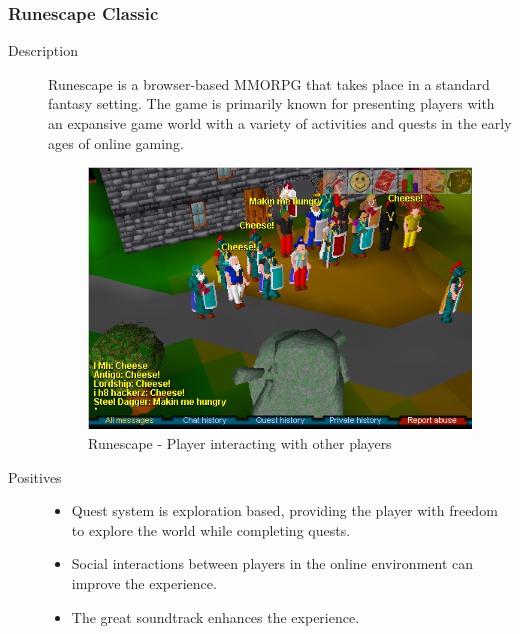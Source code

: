 \clearpage
\subsubsection{Runescape Classic}
\begin{description}
\item[Description]{Runescape is a browser-based MMORPG that takes place in a standard fantasy setting. The game is primarily known for presenting players with an expansive game world with a variety of activities and quests in the early ages of online gaming.

\begin{figure}[H]
	\centering\includegraphics[width=.25\linewidth]{images/game_runescape}
	\caption{Runescape - Player interacting with other players}
	\label{fig:runescape}
\end{figure}
}
\item[Positives]{
\begin{itemize}
    \item{Quest system is exploration based, providing the player with freedom to explore the world while completing quests.}
    \item{Social interactions between players in the online environment can improve the experience.}
    \item{The great soundtrack enhances the experience.}
\end{itemize}
}


\end{description}
